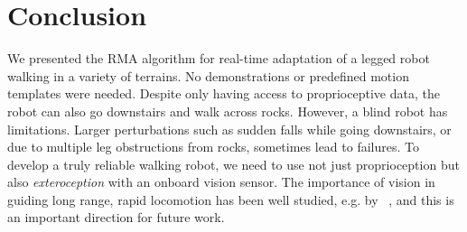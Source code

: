 \documentclass[conference]{IEEEtran}
\newcommand{\algo}{RMA}
\begin{document}
\section{Conclusion}
We presented the \algo{} algorithm for real-time adaptation of a legged robot walking in a variety of terrains. No demonstrations or predefined motion templates were needed. %
Despite only having access to proprioceptive data, the robot can also go downstairs and walk across rocks. However, a blind robot has limitations. Larger perturbations such as sudden falls while going downstairs, or due to multiple leg obstructions from rocks, sometimes lead to failures. To develop a truly reliable walking robot, we need to use not just proprioception but also  {\em exteroception} with an onboard vision sensor. The importance of vision in guiding long range, rapid locomotion has been well studied,  e.g. by ~\cite{matthis2018gaze}, and this is an important direction for future work.
\end{document}
